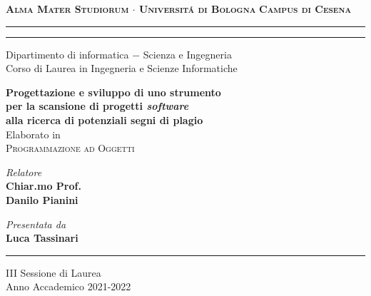 \begin{titlepage}
    \begin{center}
        {\Large
            \textbf{
                \textsc{Alma Mater Studiorum $\cdot$ Universit\'a di Bologna}
            }
        }
        {\large
            \textbf{
                \textsc{Campus di Cesena}
            }
        }
        \rule[0.1cm]{16cm}{0.1mm}
        \rule[0.5cm]{16cm}{0.6mm}
        {\Large
                Dipartimento di informatica $-$ Scienza e Ingegneria \\
        }
        \vspace*{4mm}
        {\Large 
            Corso di Laurea in Ingegneria e Scienze Informatiche
        }
        \vspace*{30mm}
        \begin{center}
            {\LARGE
                \textbf{
                    Progettazione e sviluppo di uno strumento \\
                    per la scansione di progetti \textit{software} \\
                    alla ricerca di potenziali segni di plagio \\
                }
            }
            \vspace*{15mm}
            {\Large
                Elaborato in
            } \\
            \vspace*{3mm}
            {\Large
                \textsc{Programmazione ad Oggetti}
            }
        \end{center}
        \vspace*{45mm}
        \begin{minipage}[t]{0.47\textwidth}
            {\large
                \textit{Relatore} \\
                \textbf{
                    Chiar.mo Prof.\\
                    Danilo Pianini
                }
            }
        \end{minipage}
        \begin{minipage}[t]{0.47\textwidth}\raggedleft
            {\large
                \textit{Presentata da} \\
                \textbf{Luca Tassinari}
            }
        \end{minipage}
    \end{center}
    \begin{center}
        \vspace*{30mm}
        \rule[0.1cm]{16cm}{0.1mm}  
    \end{center}
    \begin{center}
        {\large
            III Sessione di Laurea
        } \\
        \vspace*{2mm}
        {\large
            Anno Accademico 2021-2022
        }
    \end{center}
\end{titlepage}
\restoregeometry